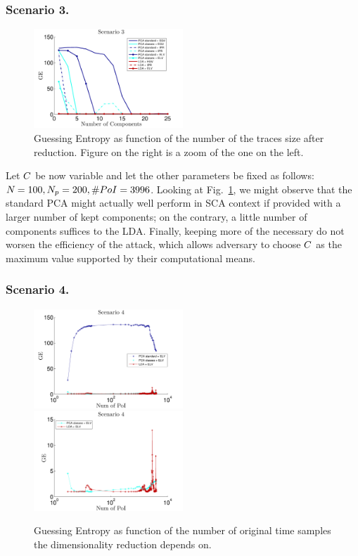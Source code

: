 \subsubsection{Scenario 3.}
\begin{figure}
\centering
\includegraphics[width=0.5\textwidth]{figures/Criterion3.pdf}
\caption{Guessing Entropy as function of the number of the traces size after reduction. Figure on the right is a zoom of the one on the left.}\label{fig:3}
\end{figure}


Let  $\newTraceLength$ be now variable and let the other parameters be fixed as follows: $\numTraces[] = 100, N_p=200, \numPoI = 3996$. Looking at Fig.~\ref{fig:3}, we might observe that the standard PCA might actually well perform in SCA context if provided with a larger number of kept components; on the contrary, a little number of components suffices to the LDA. Finally, keeping more of the necessary do not worsen the efficiency of the attack, which allows adversary to choose $\newTraceLength$ as the maximum value supported by their computational means.



\subsubsection{Scenario 4.}
\begin{figure}
\includegraphics[width=0.5\textwidth]{figures/Criterion4.pdf}
\includegraphics[width=0.5\textwidth]{figures/Criterion4cutted.pdf} 
\caption{Guessing Entropy as function of the number of original time samples the dimensionality reduction depends on.}\label{fig:4}
\end{figure}

